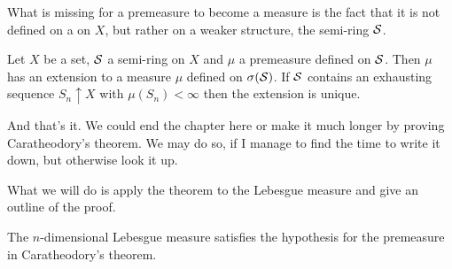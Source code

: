 What is missing for a premeasure to become a measure is the fact that it is not defined on a \siga on $X$, but rather on a weaker structure, the semi-ring $\mathcal{S}$.

\begin{thm}[Caratheodory]
	Let $X$ be a set, $\mathcal{S}$ a semi-ring on $X$ and $\mu$ a premeasure defined on $\mathcal{S}$. Then $\mu$ has an extension to a measure $\mu$ defined on $\sigma(\mathcal{S})$. If $\mathcal{S}$ contains an exhausting sequence $S_n \uparrow X$ with $\mu(S_n) < \infty$ then the extension is unique.
\end{thm}

And that's it. We could end the chapter here or make it much longer by proving Caratheodory's theorem. We may do so, if I manage to find the time to write it down, but otherwise look it up.

What we will do is apply the theorem to the Lebesgue measure and give an outline of the proof.

\begin{remark}
	The $n$-dimensional Lebesgue measure satisfies the hypothesis for the premeasure in Caratheodory's theorem.
\end{remark}